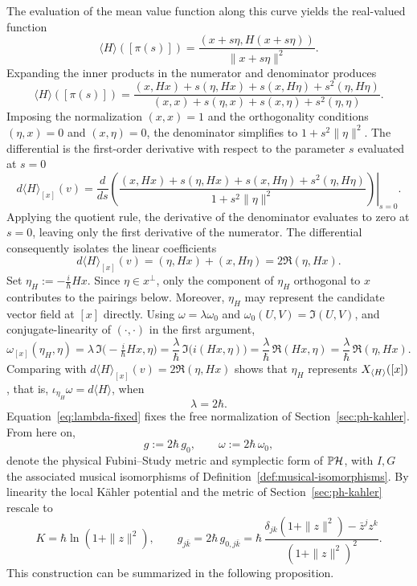 \noindent The evaluation of the mean value function along this curve yields the real-valued function
\[
	\langle H\rangle([\pi(s)]) = \frac{(x + s\eta, H(x + s\eta))}{\|x + s\eta\|^2}.
\]
Expanding the inner products in the numerator and denominator produces
\[
	\langle H\rangle([\pi(s)]) = \frac{(x, Hx) + s(\eta, Hx) + s(x, H\eta) + s^2(\eta, H\eta)}{(x, x) + s(\eta, x) + s(x, \eta) + s^2(\eta, \eta)}.
\]
Imposing the normalization $(x, x) = 1$ and the orthogonality conditions $(\eta, x) = 0$ and $(x, \eta) = 0$, the denominator simplifies to $1 + s^2\|\eta\|^2$. The differential is the first-order derivative with respect to the parameter $s$ evaluated at $s=0$
\[
	d\langle H\rangle_{[x]}(v) = \left. \frac{d}{ds} \left( \frac{(x, Hx) + s(\eta, Hx) + s(x, H\eta) + s^2(\eta, H\eta)}{1 + s^2\|\eta\|^2} \right) \right|_{s=0}.
\]
Applying the quotient rule, the derivative of the denominator evaluates to zero at $s=0$, leaving only the first derivative of the numerator. The differential consequently isolates the linear coefficients
\[
	d\langle H\rangle_{[x]}(v) = (\eta, Hx) + (x, H\eta) = 2\Re(\eta, Hx).
\]
Set $\eta_H:=-\tfrac{i}{\hbar}Hx$. Since $\eta\in x^\perp$, only the
component of $\eta_H$ orthogonal to $x$ contributes to the pairings
below. Moreover, $\eta_H$ may represent the candidate vector field at $[x]$
directly. Using $\omega=\lambda\omega_0$ and $\omega_0(U,V)=\Im(U,V)$,
and conjugate-linearity of $(\cdot,\cdot)$ in the first argument,
\[
\omega_{[x]}(\eta_H,\eta)=\lambda\,\Im\big(-\tfrac{i}{\hbar}Hx,\eta\big)=\frac{\lambda}{\hbar}\,\Im\big(i(Hx,\eta)\big)=\frac{\lambda}{\hbar}\,\Re(Hx,\eta)=\frac{\lambda}{\hbar}\,\Re(\eta,Hx).
\]
Comparing with $d\langle H\rangle_{[x]}(v)=2\Re(\eta,Hx)$ shows that
$\eta_H$ represents $X_{\langle H\rangle}([x])$, that is,
$\iota_{\eta_H}\omega=d\langle H\rangle$,  when
\begin{equation}
	\lambda=2\hbar. \label{eq:lambda-fixed}
\end{equation}
\noindent Equation~\eqref{eq:lambda-fixed} fixes the free normalization of
Section~\ref{sec:ph-kahler}. From here on,
\begin{equation}
	g:=2\hbar\,g_0, \qquad \omega:=2\hbar\,\omega_0, \label{eq:physical-kahler-structure}
\end{equation}
denote the physical Fubini--Study metric and symplectic form of $\PH$,
with $I,G$ the associated musical isomorphisms of
Definition~\ref{def:musical-isomorphisms}. By linearity the local Kähler potential and the metric
of Section~\ref{sec:ph-kahler} rescale to
\[
K=\hbar\ln(1+\|z\|^2), \qquad
g_{j\bar k}=2\hbar\,g_{0,j\bar k}=\hbar\,\frac{\delta_{jk}(1+\|z\|^2)-\bar z^jz^k}{(1+\|z\|^2)^2}.
\]
This construction can be summarized in the following proposition.

